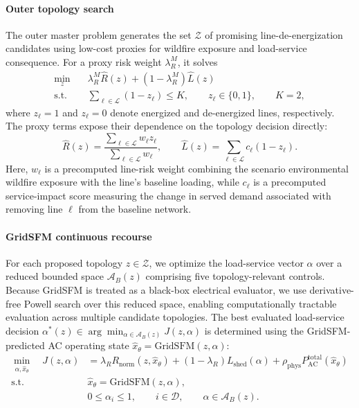 \documentclass{article}
\begin{document}
\paragraph{Outer topology search}
The outer master problem generates the set $\mathcal{Z}$ of promising
line-de-energization candidates using low-cost proxies for wildfire exposure
and load-service consequence. For a proxy risk weight $\lambda_R^M$, it solves
\begin{equation}
\begin{aligned}
\min_{z}\quad &
\lambda_R^M \widehat{R}(z)
+(1-\lambda_R^M)\widehat{L}(z) \\
\text{s.t.}\quad &
\sum_{\ell\in\mathcal{L}}(1-z_\ell)\leq K,
\qquad
z_\ell\in\{0,1\},
\qquad K=2 ,
\end{aligned}
\label{eq:topology_master}
\end{equation}
where $z_\ell=1$ and $z_\ell=0$ denote energized and de-energized lines,
respectively. The proxy terms expose their dependence on the topology decision
directly:
\begin{equation}
\widehat{R}(z)
=
\frac{\sum_{\ell\in\mathcal{L}} w_\ell z_\ell}
     {\sum_{\ell\in\mathcal{L}} w_\ell},
\qquad
\widehat{L}(z)
=
\sum_{\ell\in\mathcal{L}} c_\ell(1-z_\ell).
\label{eq:topology_proxies}
\end{equation}
Here, $w_\ell$ is a precomputed line-risk weight combining the scenario
environmental wildfire exposure with the line's baseline loading, while
$c_\ell$ is a precomputed service-impact score measuring the change in served
demand associated with removing line $\ell$ from the baseline network. 

\paragraph{GridSFM continuous recourse}
For each proposed topology $z\in\mathcal{Z}$, we optimize the load-service
vector $\alpha$ over a reduced bounded space $\mathcal{A}_B(z)$ comprising
five topology-relevant controls. Because GridSFM is treated as a
black-box electrical evaluator, we use derivative-free Powell search over this
reduced space, enabling computationally tractable evaluation across multiple candidate topologies. The best evaluated load-service decision
$\alpha^*(z)\in\arg\min_{\alpha\in\mathcal{A}_B(z)}J(z,\alpha)$ is determined
using the GridSFM-predicted AC operating state
$\hat{x}_\theta=\mathrm{GridSFM}(z,\alpha)$:
\begin{equation}
\begin{aligned}
\min_{\alpha,\hat{x}_\theta}\quad
J(z,\alpha)
&=
\lambda_R R_{\mathrm{norm}}(z,\hat{x}_\theta)
+(1-\lambda_R)L_{\mathrm{shed}}(\alpha)
+\rho_{\mathrm{phys}}P_{\mathrm{AC}}^{\mathrm{total}}(\hat{x}_\theta) \\
\text{s.t.}\quad
&\hat{x}_\theta=\mathrm{GridSFM}(z,\alpha),\\
&0\leq\alpha_i\leq1,\qquad i\in\mathcal{D},
\qquad \alpha\in\mathcal{A}_B(z).
\end{aligned}
\label{eq:gridsfm_recourse}
\end{equation}
\end{document}
